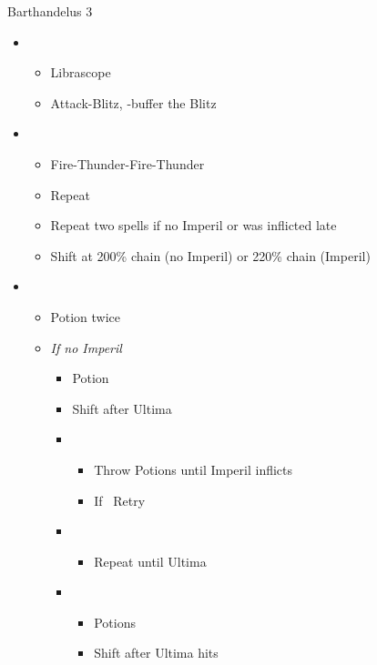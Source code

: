 \begin{battle}[1:24]{Barthandelus 3}
	\begin{multicols}{2}
		\begin{itemize}
			\item \second
			      \begin{itemize}
				      \item Librascope
				      \item Attack-Blitz, \rav-buffer the Blitz
			      \end{itemize}
			\item \fifth
			      \begin{itemize}
				      \item Fire-Thunder-Fire-Thunder
				      \item Repeat
				      \item Repeat two spells if no Imperil or was inflicted late
				      \item Shift at 200\% chain (no Imperil) or 220\% chain (Imperil)
			      \end{itemize}
			\item \third
			      \begin{itemize}
				      \item Potion twice
				      \item \textit{If no Imperil}
				            \begin{itemize}
					            \item Potion
					            \item Shift after Ultima
					            \item \fifth
					                  \begin{itemize}
						                  \item Throw Potions until Imperil inflicts
						                  \item If \stagger\ Retry
					                  \end{itemize}
					            \item \first
					                  \begin{itemize}
						                  \item Repeat until Ultima
					                  \end{itemize}
					            \item \third
					                  \begin{itemize}
						                  \item Potions
						                  \item Shift after Ultima hits

\end{itemize}
\end{itemize}
\end{itemize}
\end{itemize}
\end{multicols}
\end{battle}
